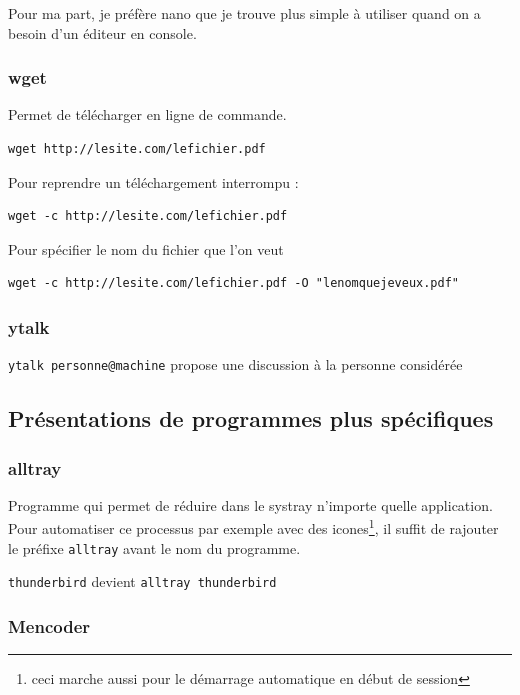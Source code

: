 \documentclass[a4paper,twoside]{article}
\begin{document}
\begin{remarque}
Pour ma part, je préfère nano que je trouve plus simple à utiliser quand on a besoin d'un éditeur en console.
\end{remarque}

\subsubsection{wget}\label{sec:wget}
Permet de télécharger en ligne de commande.

\begin{verbatim}
wget http://lesite.com/lefichier.pdf
\end{verbatim}

Pour reprendre un téléchargement interrompu :
\begin{verbatim}
wget -c http://lesite.com/lefichier.pdf
\end{verbatim}

Pour spécifier le nom du fichier que l'on veut
\begin{verbatim}
wget -c http://lesite.com/lefichier.pdf -O "lenomquejeveux.pdf"
\end{verbatim}

\subsubsection{ytalk}
\verb|ytalk personne@machine| propose une discussion à la personne considérée


\subsection{Présentations de programmes plus spécifiques}
\subsubsection{alltray}
Programme qui permet de réduire dans le systray n'importe quelle application. Pour automatiser ce processus par exemple avec des icones\footnote{ceci marche aussi pour le démarrage automatique en début de session}, il suffit de rajouter le préfixe \verb|alltray| avant le nom du programme.

\begin{exemple}
\texttt{thunderbird} devient \texttt{alltray thunderbird}
\end{exemple}

\subsubsection{Mencoder}
\end{document}
